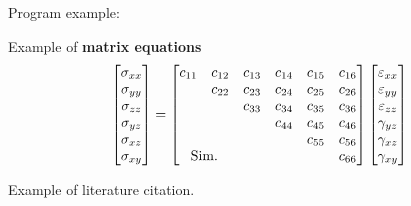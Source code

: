 \documentclass[12pt,oneside]{book}
\begin{document}
Program example:


Example of \textbf{matrix equations} %
\footnotesize
\begin{equation}
    \begin{bmatrix}
       \sigma_{xx} \\
       \sigma_{yy} \\
       \sigma_{zz} \\
       \sigma_{yz} \\
       \sigma_{xz} \\
       \sigma_{xy} \\
    \end{bmatrix} 
     = 
    \begin{bmatrix}
       c_{11} & c_{12} & c_{13} & c_{14} & c_{15} & c_{16} \\
       & c_{22} & c_{23} & c_{24} & c_{25} & c_{26} \\
       & & c_{33} & c_{34} & c_{35} & c_{36} \\
       & & & c_{44} & c_{45} & c_{46} \\
       & & & & c_{55} & c_{56} \\
       \multicolumn{2}{c}{\text{Sim.}} & & & & c_{66} \\
    \end{bmatrix} 
    \begin{bmatrix}
       \varepsilon_{xx} \\
       \varepsilon_{yy} \\
       \varepsilon_{zz} \\
       \gamma_{yz} \\
       \gamma_{xz} \\
       \gamma_{xy} \\
    \end{bmatrix} 
\end{equation}

Example of literature citation\cite{petrasinovic22}.
 
\pagestyle{listing}

\cleardoublepage
{}
{} 
\printbibliography
\end{document}
